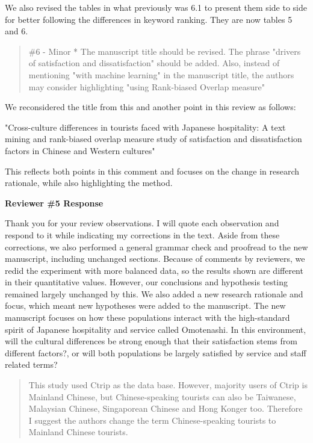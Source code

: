 \documentclass{letter}
\begin{document}
We also revised the tables in what previously was 6.1 to present them side to side for better following the differences in keyword ranking. They are now tables 5 and 6.



\begin{quotation}
\#6 - Minor
*  The manuscript title should be revised. The phrase "drivers of satisfaction and dissatisfaction" should be added. Also, instead of mentioning "with machine learning" in the manuscript title, the authors may consider highlighting "using Rank-biased Overlap measure"

\end{quotation}

We reconsidered the title from this and another point in this review as follows:

"Cross-culture differences in tourists faced with Japanese hospitality: A text mining and rank-biased overlap measure study of satisfaction and dissatisfaction factors in Chinese and Western cultures"

This reflects both points in this comment and focuses on the change in research rationale, while also highlighting the method.



\clearpage
\textbf{Reviewer \#5 Response}


Thank you for your review observations. I will quote each observation and respond to it while indicating my corrections in the text.
Aside from these corrections, we also performed a general grammar check and proofread to the new manuscript, including unchanged sections. Because of comments by reviewers, we redid the experiment with more balanced data, so the results shown are different in their quantitative values. However, our conclusions and hypothesis testing remained largely unchanged by this. We also added a new research rationale and focus, which meant new hypotheses were added to the manuscript. The new manuscript focuses on how these populations interact with the high-standard spirit of Japanese hospitality and service called Omotenashi. In this environment, will the cultural differences be strong enough that their satisfaction stems from different factors?, or will both populations be largely satisfied by service and staff related terms?


\begin{quotation}
This study used Ctrip as the data base. However, majority users of Ctrip is Mainland Chinese, but Chinese-speaking tourists can also be Taiwanese, Malaysian Chinese, Singaporean Chinese and Hong Konger too. Therefore I suggest the authors change the term Chinese-speaking tourists to Mainland Chinese tourists.
\end{quotation}
\end{document}
